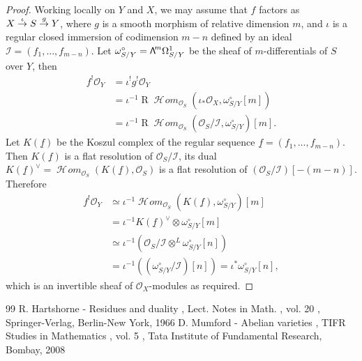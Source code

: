 \documentclass[10pt,a4paper]{amsart}
\newcommand\bw[1]{\mathbin{\hbox{$\mathsf{\Lambda}$}^{\!#1}}}
\newcommand\To[1]{\mathchoice{\xrightarrow{\textstyle\kern4pt#1\kern3pt}}{\stackrel{#1}{\to}}{}{}}
\numberwithin{equation}{section}
\theoremstyle{definition}
\newcommand{\s}[1]{\mathscr{#1}}
\DeclareMathOperator{\R}{R}
\DeclareMathOperator{\sHom}{\s{H}\!\mathit{om}}
\begin{document}
\begin{proof}
Working locally on $Y$ and $X$, we may assume that $f$ factors as $X \To{\iota} S \To{g} Y$, where $g$ is a smooth morphism of relative dimension $m$, and $\iota$ is a regular closed immersion of codimension $m-n$ defined by an ideal $\s{I}=(f_1,\ldots, f_{m-n})$. Let $\omega^{\circ}_{S/Y}=\bw{m}\Omega^{1}_{S/Y}$ be the sheaf of $m$-differentials of $S$ over $Y$, then
\begin{align*}
f^!\s{O}_Y & = \iota^! g^! \s{O}_Y \\
		 & = \iota^{-1} \R \sHom_{\s{O}_S}(\iota_* \s{O}_X, \omega_{S/Y}^\circ[m]) \\
		 & = \iota^{-1} \R \sHom_{\s{O}_S}(\s{O}_S/\s{I}, \omega_{S/Y}^\circ)[m].
\end{align*}
Let $K(\underline{f})$ be the Koszul complex of the regular sequence $\underline{f}=(f_1,\ldots, f_{m-n})$. Then $K(\underline{f})$ is a flat resolution of $\s{O}_S/\s{I}$, its dual $K(\underline{f})^\vee=\sHom_{\s{O}_S}(K(\underline{f}), \s{O}_S)$ is a flat resolution of \mbox{\((\s{O}_S/\s{I})[-(m-n)]\)}. Therefore
\begin{align*}
f^!\s{O}_Y & \simeq \iota^{-1} \sHom_{\s{O}_S}(K(\underline{f}), \omega^\circ_{S/Y})[m] \\
		 & = \iota^{-1} K(\underline{f})^\vee \otimes \omega^\circ_{S/Y} [m] \\
		 & \simeq \iota^{-1}(\s{O}_{S}/\s{I}\otimes ^L \omega^\circ_{S/Y}[n]) \\
		 & = \iota^{-1}((\omega^\circ_{S/Y}/\s{I})[n]) = \iota^* \omega^{\circ}_{S/Y}[n],
\end{align*}
which is an invertible sheaf of $\s{O}_X$-modules as required.
\end{proof}

\begin{thebibliography}{99}
 R. Hartshorne - Residues and duality , Lect. Notes in Math. , vol. 20 , Springer-Verlag, Berlin-New York, 1966
 D. Mumford - Abelian varieties , TIFR Studies in Mathematics , vol. 5 , Tata Institute of Fundamental Research, Bombay, 2008
\end{thebibliography}
\end{document}

